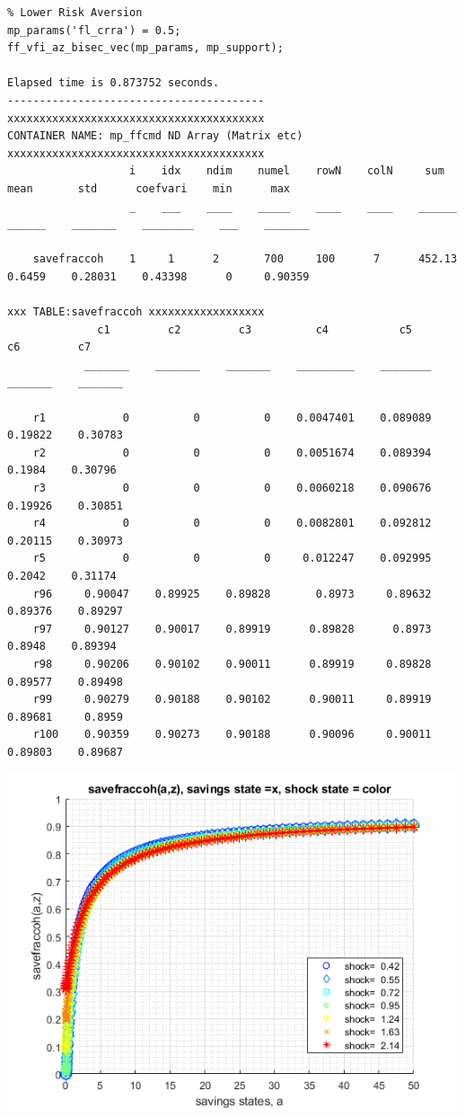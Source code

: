 \documentclass[
]{book}
\begin{document}
\begin{verbatim}
% Lower Risk Aversion
mp_params('fl_crra') = 0.5;
ff_vfi_az_bisec_vec(mp_params, mp_support);

Elapsed time is 0.873752 seconds.
----------------------------------------
xxxxxxxxxxxxxxxxxxxxxxxxxxxxxxxxxxxxxxxx
CONTAINER NAME: mp_ffcmd ND Array (Matrix etc)
xxxxxxxxxxxxxxxxxxxxxxxxxxxxxxxxxxxxxxxx
                   i    idx    ndim    numel    rowN    colN     sum       mean       std      coefvari    min      max  
                   _    ___    ____    _____    ____    ____    ______    ______    _______    ________    ___    _______

    savefraccoh    1     1      2       700     100      7      452.13    0.6459    0.28031    0.43398      0     0.90359

xxx TABLE:savefraccoh xxxxxxxxxxxxxxxxxx
              c1         c2         c3          c4           c5         c6         c7   
            _______    _______    _______    _________    ________    _______    _______

    r1            0          0          0    0.0047401    0.089089    0.19822    0.30783
    r2            0          0          0    0.0051674    0.089394     0.1984    0.30796
    r3            0          0          0    0.0060218    0.090676    0.19926    0.30851
    r4            0          0          0    0.0082801    0.092812    0.20115    0.30973
    r5            0          0          0     0.012247    0.092995     0.2042    0.31174
    r96     0.90047    0.89925    0.89828       0.8973     0.89632    0.89376    0.89297
    r97     0.90127    0.90017    0.89919      0.89828      0.8973     0.8948    0.89394
    r98     0.90206    0.90102    0.90011      0.89919     0.89828    0.89577    0.89498
    r99     0.90279    0.90188    0.90102      0.90011     0.89919    0.89681     0.8959
    r100    0.90359    0.90273    0.90188      0.90096     0.90011    0.89803    0.89687
\end{verbatim}

\includegraphics[width=5.20833in,height=\textheight]{img/fx_vfi_az_bisec_vec_images/figure_2.png}
\end{document}
